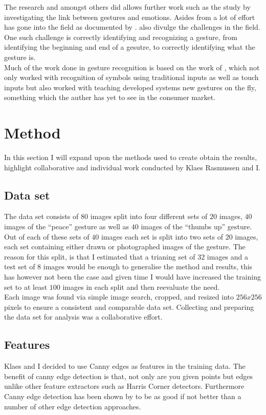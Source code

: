 \documentclass[11pt, a4paper]{article}
\begin{document}
The research  and  amongst others did allows further work such as the study by  investigating the link between gestures and emotions. Asides from  a lot of effort has gone into the field as documented by .  also divulge the challenges in the field. One such challenge is correctly identifying and recognizing a gesture, from identifying the beginning and end of a gesutre, to correctly identifying what the gesture is.\\

Much of the work done in gesture recognition is based on the work of , which not only worked with recognition of symbols using traditional inputs as well as touch inputs but also worked with teaching developed systems new gestures on the fly, something which the auther has yet to see in the consumer market.
\section{Method}
In this section I will expand upon the methods used to create obtain the results, highlight collaborative and individual work conducted by Klaes Rasmussen and I.\\
\subsection{Data set}
The data set consists of \(80\) images split into four different sets of \(20\) images, \(40\) images of the ``peace'' gesture as well as \(40\) images of the ``thumbs up'' gesture. Out of each of these sets of \(40\) images each set is split into two sets of \(20\) images, each set containing either drawn or photographed images of the gesture. The reason for this split, is that I estimated that a trianing set of \(32\) images and a test set of \(8\) images would be enough to generalise the method and results, this has however not been the case and given time I would have increased the training set to at least \(100\) images in each split and then reevaluate the need.\\
Each image was found via simple image search, cropped, and resized into \(256x256\) pixels to ensure a consistent and comparable data set. Collecting and preparing the data set for analysis was a collaborative effort.\\
\subsection{Features}
Klaes and I decided to use Canny edges as features in the training data. The benefit of canny edge detection is that, not only are you given points but edges unlike other feature extractors such as Harris Corner detectors. Furthermore Canny edge detection has been shown by  to be as good if not better than a number of other edge detection approaches.\\
\end{document}
